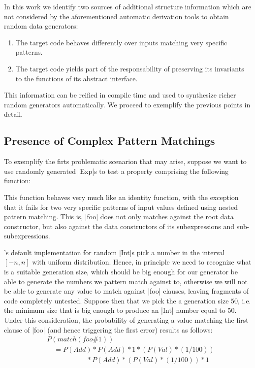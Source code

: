 In this work we identify two sources of additional structure information which
are not considered by the aforementioned automatic derivation tools to obtain
random data generators:

\begin{enumerate}
\item The target code behaves differently over inputs matching very specific
  patterns.
\item The target code yields part of the responsability of preserving its
  invariants to the functions of its abstract interface.
\end{enumerate}

This information can be reified in compile time and used to synthesize richer
random generators automatically. We proceed to exemplify the previous points in
detail.

\subsection*{\textbf{Presence of Complex Pattern Matchings}}

To exemplify the firts problematic scenarion that may arise, suppose we want to
use randomly generated |Exp|s to test a property comprising the following
function:


This function behaves very much like an identity function, with the exception
that it fails for two very specific patterns of input values defined using
nested pattern matching.
%
This is, |foo| does not only matches against the root data constructor, but also
against the data constructors of its subexpressions and sub-subexpressions.


\quickcheck's default implementation for random |Int|s pick a number in the
interval $[-n, n]$ with uniform distribution.
%
Hence, in principle we need to recognize what is a suitable generation size,
which should be big enough for our generator be able to generate the numbers we
pattern match against to, otherwise we will not be able to generate any value to
match against |foo| clauses, leaving fragments of code completely untested.
%
Suppose then that we pick the a generation size $50$, i.e. the minimum size that
is big enough to produce an |Int| number equal to $50$.
%
Under this consideration, the probability of generating a value matching the
first clause of |foo| (and hence triggering the first error) results as follows:
%
\begin{align*}
  &P(match(foo\#1))\\
  &\quad = P(Add)       * P(Add) * 1 * (P(Val) * (1/100)) \\
  &\phantom{xxxxxxxxxx} * P(Add) * (P(Val) * (1/100)) * 1
\end{align*}


